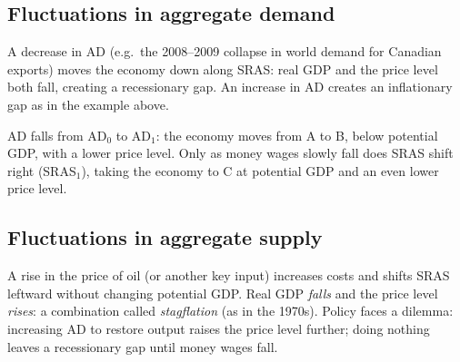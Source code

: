 \subsection{Fluctuations in aggregate demand}

A decrease in AD (e.g.\ the 2008--2009 collapse in world demand for Canadian exports) moves
the economy down along SRAS: real GDP and the price level both fall, creating a
recessionary gap. An increase in AD creates an inflationary gap as in the example above.

\begin{center}
\end{center}
AD falls from AD$_0$ to AD$_1$: the economy moves from A to B, below potential GDP, with a
lower price level. Only as money wages slowly fall does SRAS shift right (SRAS$_1$), taking
the economy to C at potential GDP and an even lower price level.

\subsection{Fluctuations in aggregate supply}

A rise in the price of oil (or another key input) increases costs and shifts SRAS
leftward without changing potential GDP. Real GDP \emph{falls} and the price level
\emph{rises}: a combination called \emph{stagflation} (as in the 1970s). Policy faces a
dilemma: increasing AD to restore output raises the price level further; doing nothing
leaves a recessionary gap until money wages fall.

